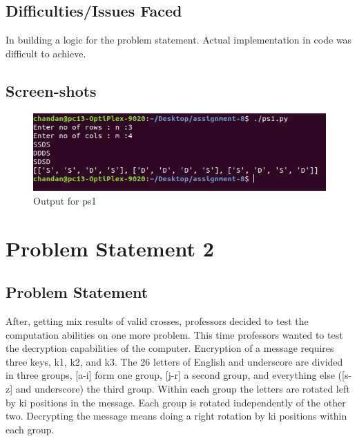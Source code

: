 \documentclass[a4paper,12pt]{article}
\begin{document}
	\subsection{Difficulties/Issues Faced}
	In building a logic for the problem statement. Actual implementation in code was difficult to achieve.
	

	\newpage
	\subsection{Screen-shots}
	
	
		\begin{figure}[h]
		\includegraphics[scale=0.7]{ps1.png}
		\caption{Output for ps1}
		\label{fig:ps1_1}
		\end{figure}
	

	
	\newpage
	
	\section{Problem Statement 2}

	
	\subsection{Problem Statement}
		After, getting mix results of valid crosses, professors decided to test the computation abilities on one more problem. This time professors wanted to test the decryption capabilities of the computer.
	Encryption of  a message requires three keys, k1, k2, and k3. The 26 letters of English and underscore are divided in three groups,  [a-i] form one group, [j-r] a second group, and everything else ([s-z] and underscore) the third group. Within each group the letters are rotated left by ki positions in the message. Each group is rotated independently of the other two. Decrypting the message means doing a right rotation by ki positions within each group.
	
\end{document}
